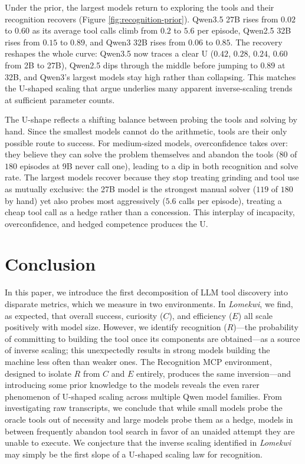 \documentclass{article}
\begin{document}
Under the prior, the largest models return to exploring the tools and their recognition recovers  (Figure \ref{fig:recognition-prior}). Qwen3.5 27B rises from $0.02$ to $0.60$ as its average tool calls climb from $0.2$ to $5.6$ per episode, Qwen2.5 32B rises from $0.15$ to $0.89$, and Qwen3 32B rises from $0.06$ to $0.85$. The recovery reshapes the whole curve: Qwen3.5 now traces a clear U ($0.42$, $0.28$, $0.24$, $0.60$ from 2B to 27B), Qwen2.5 dips through the middle before jumping to $0.89$ at 32B, and Qwen3's largest models stay high rather than collapsing. This matches the U-shaped scaling that \citep{wei2023ushaped} argue underlies many apparent inverse-scaling trends at sufficient parameter counts.

The U-shape reflects a shifting balance between probing the tools and solving by hand. Since the smallest models cannot do the arithmetic, tools are their only possible route to success. For medium-sized models, overconfidence takes over: they believe they can solve the problem themselves and abandon the tools ($80$ of $180$ episodes at 9B never call one), leading to a dip in both recognition and solve rate. The largest models recover because they stop treating grinding and tool use as mutually exclusive: the 27B model is the strongest manual solver ($119$ of $180$ by hand) yet also probes most aggressively ($5.6$ calls per episode), treating a cheap tool call as a hedge rather than a concession. This interplay of incapacity, overconfidence, and hedged competence produces the U.

\section{Conclusion}
\label{sec:conclusion}

In this paper, we introduce the first decomposition of LLM tool discovery into disparate metrics, which we measure in two environments. In \emph{Lomekwi}, we find, as expected, that overall success, curiosity ($C$), and efficiency ($E$) all scale positively with model size. However, we identify recognition ($R$)---the probability of committing to building the tool once its components are obtained---as a source of inverse scaling; this unexpectedly results in strong models building the machine less often than weaker ones. The Recognition MCP environment, designed to isolate $R$ from $C$ and $E$ entirely, produces the same inversion---and introducing some prior knowledge to the models reveals the even rarer phenomenon of U-shaped scaling across multiple Qwen model families. From investigating raw transcripts, we conclude that while small models probe the oracle tools out of necessity and large models probe them as a hedge, models in between frequently abandon tool search in favor of an unaided attempt they are unable to execute. We conjecture that the inverse scaling identified in \textit{Lomekwi} may simply be the first slope of a U-shaped scaling law for recognition.
\end{document}
